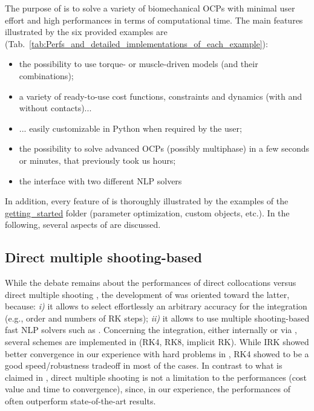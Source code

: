 The purpose of \bioptim is to solve a variety of biomechanical OCPs with minimal user effort and high performances in terms of computational time. 
The main features illustrated by the six provided examples are (Tab.~\ref{tab:Perfs_and_detailed_implementations_of_each_example}): 
\begin{itemize}
\item the possibility to use torque- or muscle-driven models (and their combinations);
\item a variety of ready-to-use cost functions, constraints and dynamics (with and without contacts)...
\item ... easily customizable in Python when required by the user;
\item the possibility to solve advanced OCPs (possibly multiphase) in a few seconds or minutes, that previously took us hours;
\item the interface with two different NLP solvers
\end{itemize}
In addition, every feature of \bioptim is thoroughly illustrated by the examples of the \href{https://github.com/pyomeca/bioptim/tree/master/examples/getting_started}{getting\_started} folder (parameter optimization, custom objects, etc.).
In the following, several aspects of \bioptim are discussed.


\subsection{Direct multiple shooting-based}

While the debate remains about the performances of direct collocations versus direct multiple shooting \cite{diehl2006fast, porsa2016direct}, the development of \bioptim was oriented toward the latter, because: \textit{i)} it allows to select effortlessly an arbitrary accuracy for the integration (e.g., order and numbers of RK steps); \textit{ii)} it allows to use multiple shooting-based fast NLP solvers such as \acados.
Concerning the integration, either internally or via \acados, several schemes are implemented in \bioptim (RK4, RK8, implicit RK).
While IRK showed better convergence in our experience with hard problems in \acados, RK4 showed to be a good speed/robustness tradeoff in most of the cases. 
In contrast to what is claimed in \cite{porsa2016direct}, direct multiple shooting is not a limitation to the performances (cost value and time to convergence), since, in our experience, the performances of \bioptim often outperform state-of-the-art results.

